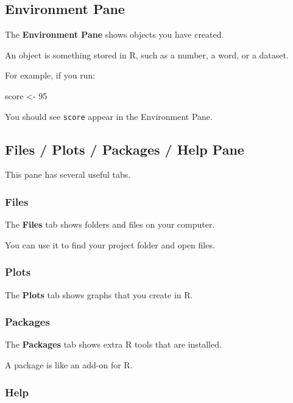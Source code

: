 \documentclass[
  letterpaper,
  DIV=11,
  numbers=noendperiod]{scrartcl}
\newenvironment{Shaded}{\begin{snugshade}}{\end{snugshade}}
\newcommand{\DecValTok}[1]{\textcolor[rgb]{0.68,0.00,0.00}{#1}}
\newcommand{\NormalTok}[1]{\textcolor[rgb]{0.00,0.23,0.31}{#1}}
\newcommand{\OtherTok}[1]{\textcolor[rgb]{0.00,0.23,0.31}{#1}}
\begin{document}
\subsection{Environment Pane}\label{environment-pane}

The \textbf{Environment Pane} shows objects you have created.

An object is something stored in R, such as a number, a word, or a
dataset.

For example, if you run:

\begin{Shaded}
\begin{Highlighting}[]
\NormalTok{score }\OtherTok{\textless{}{-}} \DecValTok{95}
\end{Highlighting}
\end{Shaded}

You should see \texttt{score} appear in the Environment Pane.

\subsection{Files / Plots / Packages / Help
Pane}\label{files-plots-packages-help-pane}

This pane has several useful tabs.

\subsubsection{Files}\label{files}

The \textbf{Files} tab shows folders and files on your computer.

You can use it to find your project folder and open files.

\subsubsection{Plots}\label{plots}

The \textbf{Plots} tab shows graphs that you create in R.

\subsubsection{Packages}\label{packages}

The \textbf{Packages} tab shows extra R tools that are installed.

A package is like an add-on for R.

\subsubsection{Help}\label{help}
\end{document}
